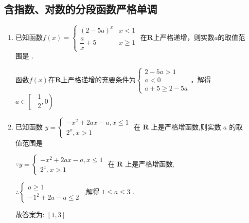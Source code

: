 \subsection*{含指数、对数的分段函数严格单调}
\begin{enumerate}
    \item 已知函数$f(x) = \left \{ \begin{array}{ll}
     (2-5a)^x & x < 1  \\
     \dfrac{a}{x} + 5 & x \geq 1
    \end{array}\right.$ 在$\mathbf{R}$上严格递增，则实数$a$的取值范围是\blkda{$\left[-\dfrac{1}{2}, 0\right)$} .
    \begin{jieda}
        函数$f(x)$在$\mathbf{R}$上严格递增的充要条件为$\left \{ \begin{array}{l}
         2-5a > 1  \\
         a < 0 \\
         a + 5 \geq 2 - 5a
    \end{array}\right.$，解得$a \in \left[-\dfrac{1}{2}, 0\right)$
    \end{jieda}
    
    \item 已知函数 $y = \left\{  \begin{matrix}  - {x}^{2} + {2ax} - a,x \leq  1 \\  {2}^{x},x > 1 \end{matrix}\right.$ 在 $\mathbf{R}$ 上是严格增函数,则实数 $a$ 的取值范围是\blkda{$[1, 3]$}
    \begin{jieda}
        $\because y = \left\{  \begin{matrix}  - {x}^{2} + {2ax} - a,x \leq  1 \\  {2}^{x},x > 1 \end{matrix}\right.$ 在 $\mathbf{R}$ 上是严格增函数,
        
        $\therefore \left\{  \begin{matrix} a \geq  1 \\   - {1}^{2} + {2a} - a \leq  2 \end{matrix}\right.$ ,解得 $1 \leq  a \leq  3$ .
        
        故答案为: $\left\lbrack  {1,3}\right\rbrack$
    \end{jieda}


\end{enumerate}
